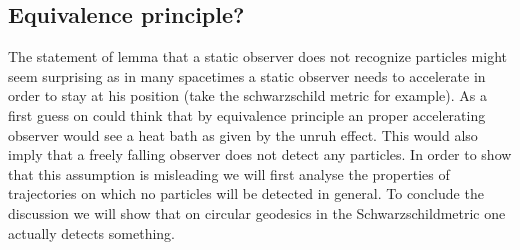 


\subsection{Equivalence principle?}

The statement of lemma  that a static observer does not recognize particles might seem surprising as in many spacetimes a static observer needs to accelerate in order to stay at his position (take the schwarzschild metric for example). As a first guess on could think that by equivalence principle an proper accelerating observer would see a heat bath as given by the unruh effect. This would also imply that a freely falling observer does not detect any particles. In order to show that this assumption is misleading we will first analyse the properties of trajectories on which no particles will be detected in general. To conclude the discussion we will show that on circular geodesics in the Schwarzschildmetric one actually detects something. 

